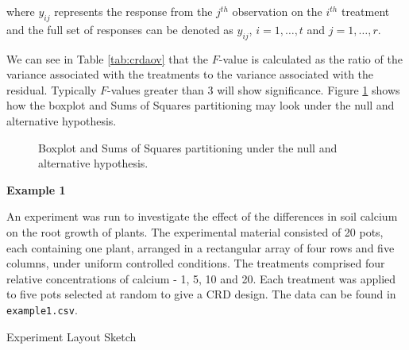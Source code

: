 \documentclass[a4paper, 10pt, fleqn, twosided]{memoir}
\begin{document}
where $y_{ij}$ represents the response from the $j^{th}$ observation on the $i^{th}$ treatment and the full set of
responses can be denoted as $y_{ij}$, $i = 1, \hdots , t$ and $j = 1, \hdots , r$.


We can see in Table \ref{tab:crdaov} that the $F$-value is calculated as the ratio of the variance associated with the
treatments to the variance associated with the residual. Typically $F$-values greater than 3 will show significance.
Figure \ref{fig:comp} shows how the boxplot and Sums of Squares partitioning may look under the null and alternative
hypothesis.


\begin{figure}[!hbtp]
\centering
{}
\caption{Boxplot and Sums of Squares partitioning under the null and alternative hypothesis.}
\label{fig:comp}
\end{figure}

\textbf{Example 1}

An experiment was run to investigate the effect of the differences in soil
calcium on the root growth of plants. The experimental material consisted of 20
pots, each containing one plant, arranged in a rectangular array of four rows
and five columns, under uniform controlled conditions. The treatments comprised
four relative concentrations of calcium - 1, 5, 10 and 20. Each treatment was
applied to five pots selected at random to give a CRD design. The data can be
found in \texttt{example1.csv}.

\begin{application}{Experiment Layout Sketch}
\vspace{10cm}
\end{application}
\end{document}

